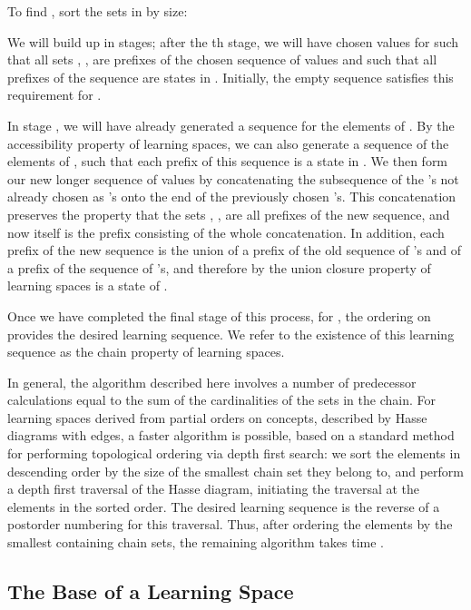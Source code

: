\documentclass[11pt]{llncs}
\begin{document}
{To find , sort the sets in  by size:

We will build up  in stages; after the th stage,
we will have chosen values for  such
that all sets , , are prefixes of the chosen sequence of values
and such that all prefixes of the sequence are states in .
Initially, the empty sequence satisfies this requirement for .

In stage , we will have already generated a sequence for the elements of .
By the accessibility property of learning spaces, we can also generate a sequence
 of the elements of , such that each prefix of this sequence is a state in . We then form our new longer sequence of  values by concatenating 
the subsequence of the 's not already chosen as 's onto the end of the previously chosen 's. This concatenation preserves the property that the sets , ,
are all prefixes of the new sequence, and now  itself is the prefix consisting of the whole concatenation. In addition, each prefix of the new sequence is the union of a prefix of the old sequence of 's and of a prefix of the sequence of 's, and therefore by the union closure property of learning spaces is a state of .

Once we have completed the final stage of this process, for ,
the ordering on  provides the desired learning sequence.
We refer to the existence of this learning sequence  as the chain property of learning spaces.

In general, the algorithm described here involves a number of predecessor calculations equal to the sum of the cardinalities of the sets in the chain. 
For learning spaces derived from partial orders on  concepts, described by Hasse diagrams with  edges, a faster algorithm is possible, based on a standard method for performing topological ordering via depth first search: we sort the elements in descending order by the size of the smallest chain set they belong to, and  perform a depth first traversal of the Hasse diagram, initiating the traversal at the elements in the sorted order. The desired learning sequence is the reverse of a postorder numbering for this traversal. Thus, after ordering the elements by the smallest containing chain sets, the remaining algorithm takes time .

\subsection{The Base of a Learning Space}

}
\end{document}
